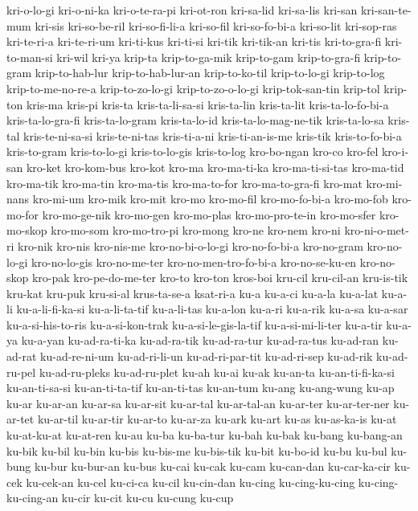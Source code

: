{kri-o-lo-gi kri-o-ni-ka kri-o-te-ra-pi kri-ot-ron kri-sa-lid kri-sa-lis
kri-san kri-san-te-mum kri-sis kri-so-be-ril kri-so-fi-li-a kri-so-fil
kri-so-fo-bi-a kri-so-lit kri-sop-ras kri-te-ri-a kri-te-ri-um kri-ti-kus
kri-ti-si kri-tik kri-tik-an kri-tis kri-to-gra-fi kri-to-man-si kri-wil
kri-ya krip-ta krip-to-ga-mik krip-to-gam krip-to-gra-fi krip-to-gram
krip-to-hab-lur krip-to-hab-lur-an krip-to-ko-til krip-to-lo-gi
krip-to-log krip-to-me-no-re-a krip-to-zo-lo-gi krip-to-zo-o-lo-gi
krip-tok-san-tin krip-tol krip-ton kris-ma kris-pi kris-ta
kris-ta-li-sa-si kris-ta-lin kris-ta-lit kris-ta-lo-fo-bi-a
kris-ta-lo-gra-fi kris-ta-lo-gram kris-ta-lo-id kris-ta-lo-mag-ne-tik
kris-ta-lo-sa kris-tal kris-te-ni-sa-si kris-te-ni-tas kris-ti-a-ni
kris-ti-an-is-me kris-tik kris-to-fo-bi-a kris-to-gram kris-to-lo-gi
kris-to-lo-gis kris-to-log kro-bo-ngan kro-co kro-fel kro-i-san kro-ket
kro-kom-bus kro-kot kro-ma kro-ma-ti-ka kro-ma-ti-si-tas kro-ma-tid
kro-ma-tik kro-ma-tin kro-ma-tis kro-ma-to-for kro-ma-to-gra-fi kro-mat
kro-mi-nans kro-mi-um kro-mik kro-mit kro-mo kro-mo-fil kro-mo-fo-bi-a
kro-mo-fob kro-mo-for kro-mo-ge-nik kro-mo-gen kro-mo-plas
kro-mo-pro-te-in kro-mo-sfer kro-mo-skop kro-mo-som kro-mo-tro-pi kro-mong
kro-ne kro-nem kro-ni kro-ni-o-met-ri kro-nik kro-nis kro-nis-me
kro-no-bi-o-lo-gi kro-no-fo-bi-a kro-no-gram kro-no-lo-gi kro-no-lo-gis
kro-no-me-ter kro-no-men-tro-fo-bi-a kro-no-se-ku-en kro-no-skop kro-pak
kro-pe-do-me-ter kro-to kro-ton kros-boi kru-cil kru-cil-an kru-is-tik
kru-kat kru-puk kru-si-al krus-ta-se-a ksat-ri-a ku-a ku-a-ci ku-a-la
ku-a-lat ku-a-li ku-a-li-fi-ka-si ku-a-li-ta-tif ku-a-li-tas ku-a-lon
ku-a-ri ku-a-rik ku-a-sa ku-a-sar ku-a-si-his-to-ris ku-a-si-kon-trak
ku-a-si-le-gis-la-tif ku-a-si-mi-li-ter ku-a-tir ku-a-ya ku-a-yan
ku-ad-ra-ti-ka ku-ad-ra-tik ku-ad-ra-tur ku-ad-ra-tus ku-ad-ran ku-ad-rat
ku-ad-re-ni-um ku-ad-ri-li-un ku-ad-ri-par-tit ku-ad-ri-sep ku-ad-rik
ku-ad-ru-pel ku-ad-ru-pleks ku-ad-ru-plet ku-ah ku-ai ku-ak ku-an-ta
ku-an-ti-fi-ka-si ku-an-ti-sa-si ku-an-ti-ta-tif ku-an-ti-tas ku-an-tum
ku-ang ku-ang-wung ku-ap ku-ar ku-ar-an ku-ar-sa ku-ar-sit ku-ar-tal
ku-ar-tal-an ku-ar-ter ku-ar-ter-ner ku-ar-tet ku-ar-til ku-ar-tir
ku-ar-to ku-ar-za ku-ark ku-art ku-as ku-as-ka-is ku-at ku-at-ku-at
ku-at-ren ku-au ku-ba ku-ba-tur ku-bah ku-bak ku-bang ku-bang-an ku-bik
ku-bil ku-bin ku-bis ku-bis-me ku-bis-tik ku-bit ku-bo-id ku-bu ku-bul
ku-bung ku-bur ku-bur-an ku-bus ku-cai ku-cak ku-cam ku-can-dan
ku-car-ka-cir ku-cek ku-cek-an ku-cel ku-ci-ca ku-cil ku-cin-dan ku-cing
ku-cing-ku-cing ku-cing-ku-cing-an ku-cir ku-cit ku-cu ku-cung ku-cup
}
